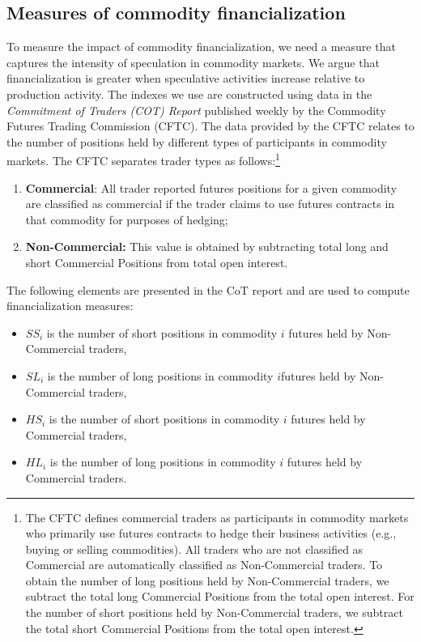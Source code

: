 \documentclass[12pt]{article}
\begin{document}
\subsection{Measures of commodity financialization}
To measure the impact of commodity financialization, we need a measure that captures the intensity of speculation in commodity markets. We argue that financialization is greater when speculative activities increase relative to production activity. The indexes we use are constructed using data in the \emph{Commitment of Traders (COT) Report} published weekly by the Commodity Futures Trading Commission (CFTC).  The data provided by the CFTC relates to the number of positions held by different types of participants in commodity markets. The CFTC separates trader types as follows:\footnote{The CFTC defines commercial traders as participants in commodity markets who primarily use futures contracts to hedge their business activities (e.g., buying or selling commodities). All traders who are not classified as Commercial are automatically classified as Non-Commercial traders. To obtain the number of long positions held by Non-Commercial traders, we subtract the total long Commercial Positions from the total open interest. For the number of short positions held by Non-Commercial traders, we subtract the total short Commercial Positions from the total open interest.}


\begin{enumerate}
\item \textbf{Commercial}: All trader reported futures positions for a given commodity are classified as commercial if the trader claims to use futures contracts in that commodity for purposes of hedging;
\item \textbf{Non-Commercial:} This value is obtained by subtracting total long and short Commercial Positions from  total open interest.
\end{enumerate}
  
The following elements are presented in the CoT report and are used to compute financialization measures:

\begin{itemize}
\item $SS_i$ is the number of short positions in commodity $i$ futures held by Non-Commercial traders,
\item $SL_i$  is the number of long positions in commodity $i$futures held by Non-Commercial traders,
\item $HS_i$ is the number of short positions in commodity $i$ futures held by Commercial traders, 
\item $HL_i$ is the number of long positions in commodity $i$ futures held by Commercial traders.
\end{itemize}
\end{document}
